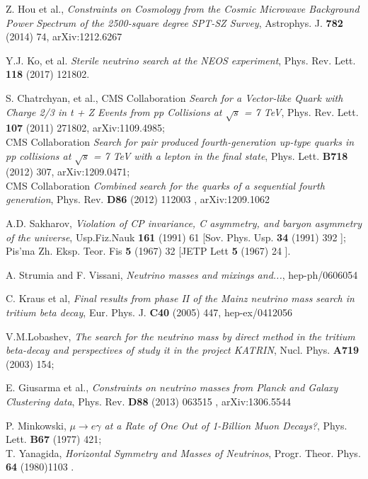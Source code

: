 \documentclass{cernyrep}
\begin{document}
\begin{thebibliography}{100}
Z. Hou et al., \emph{Constraints on Cosmology from the Cosmic Microwave Background Power Spectrum of the 2500-square degree SPT-SZ Survey}, Astrophys. J. {\bf 782}  (2014) 74, arXiv:1212.6267

Y.J. Ko, et al.  {\it Sterile neutrino search at the NEOS experiment}, Phys. Rev. Lett. {\bf 118} (2017) 121802.

S. Chatrchyan, et al.,  CMS Collaboration {\it Search
for a Vector-like Quark with Charge 2/3 in t + Z Events from pp Collisions at $\sqrt{s}$ = 7 TeV},  Phys. Rev. Lett. {\bf 107} (2011) 271802, arXiv:1109.4985;\\
CMS Collaboration {\it Search for pair produced fourth-generation up-type quarks in pp collisions at $\sqrt{s}$ = 7 TeV with a lepton in the final state},  Phys. Lett. {\bf B718} (2012) 307, arXiv:1209.0471;\\
CMS Collaboration {\it Combined search for the quarks of a sequential fourth generation}, Phys. Rev. {\bf D86} (2012) 112003 , arXiv:1209.1062

A.D. Sakharov, {\it Violation of CP invariance, C asymmetry, and baryon asymmetry of the universe},  Usp.Fiz.Nauk {\bf 161} (1991) 61 [Sov. Phys. Usp. {\bf 34} (1991) 392 ]; Pis'ma Zh. Eksp. Teor. Fis {\bf 5} (1967) 32 [JETP Lett {\bf 5} (1967) 24 ].

A. Strumia and F. Vissani,  {\it Neutrino masses and mixings and...}, hep-ph/0606054 

C. Kraus et al, {\it Final results from phase II of the Mainz neutrino mass search in
tritium beta decay},  Eur. Phys. J. {\bf C40} (2005) 447, hep-ex/0412056

V.M.Lobashev, {\it The search for the neutrino mass by direct method in the tritium
beta-decay and perspectives of study it in the project KATRIN},  Nucl. Phys. {\bf A719}
(2003) 154;

E. Giusarma et al., {\it Constraints on neutrino masses from Planck and Galaxy Clustering data}, Phys. Rev. {\bf D88} (2013) 063515 , arXiv:1306.5544

P. Minkowski, {\it $\mu \rightarrow e\gamma$ at a Rate of One Out of 1-Billion Muon Decays?}, Phys. Lett. {\bf B67} (1977)  421;\\
T. Yanagida, {\it Horizontal Symmetry and Masses of Neutrinos}, Progr.
Theor. Phys. {\bf 64} (1980)1103 .


\end{thebibliography}
\end{document}
